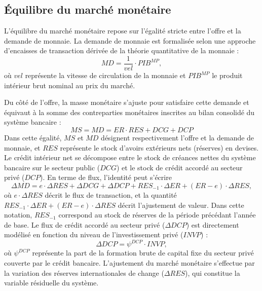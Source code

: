 \documentclass[11pt,a4paper]{article}
\newcommand{\vel}{\mathit{vel}}
\newcommand{\DCG}{\mathit{DCG}}
\newcommand{\DCP}{\mathit{DCP}}
\newcommand{\ER}{\mathit{ER}}
\newcommand{\INVP}{\mathit{INVP}}
\newcommand{\MD}{\mathit{MD}}
\newcommand{\MS}{\mathit{MS}}
\newcommand{\PIB}{\mathit{PIB}}
\newcommand{\RES}{\mathit{RES}}
\begin{document}
	
	\subsection{Équilibre du marché monétaire}
	L'équilibre du marché monétaire repose sur l'égalité stricte entre l'offre et la demande de monnaie. La demande de monnaie est formalisée selon une approche d'encaisses de transaction dérivée de la théorie quantitative de la monnaie :
	\begin{equation*}
		\MD = \frac{1}{\vel} \cdot \PIB^{\mathit{MP}},
	\end{equation*}
	où $\vel$ représente la vitesse de circulation de la monnaie et $\PIB^{\mathit{MP}}$ le produit intérieur brut nominal au prix du marché.
	
	Du côté de l'offre, la masse monétaire s'ajuste pour satisfaire cette demande et équivaut à la somme des contreparties monétaires inscrites au bilan consolidé du système bancaire :
	\begin{equation*}
		\MS = \MD = \ER \cdot \RES + \DCG + \DCP
	\end{equation*}
	Dans cette égalité, $\MS$ et $\MD$ désignent respectivement l'offre et la demande de monnaie, et $\RES$ représente le stock d'avoirs extérieurs nets (réserves) en devises. Le crédit intérieur net se décompose entre le stock de créances nettes du système bancaire sur le secteur public ($\DCG$) et le stock de crédit accordé au secteur privé ($\DCP$). 
	En terme de flux, l'identité peut s'écrire
	\begin{equation*}
		\Delta \MD = e\cdot\Delta\RES + \Delta\DCG + \Delta \DCP + \RES_{-1}\cdot\Delta\ER + (\ER - e)\cdot\Delta\RES,
	\end{equation*}
	où $e\cdot\Delta\RES$ décrit le flux de transaction, et la quantité $\RES_{-1}\cdot\Delta\ER + (\ER - e)\cdot\Delta\RES$ décrit l'ajustement de valeur. Dans cette notation, $\RES_{-1}$ correspond au stock de réserves de la période précédant l'année de base.
	Le flux de crédit accordé au secteur privé ($\Delta\DCP$) est directement modélisé en fonction du niveau de l'investissement privé ($\INVP$) :
	\begin{equation*}
		\Delta\DCP = \psi^{\DCP} \cdot \INVP,
	\end{equation*}
	où $\psi^{\DCP}$ représente la part de la formation brute de capital fixe du secteur privé couverte par le crédit bancaire. L'ajustement du marché monétaire s'effectue par la variation des réserves internationales de change ($\Delta\RES$), qui constitue la variable résiduelle du système.
	
\end{document}
